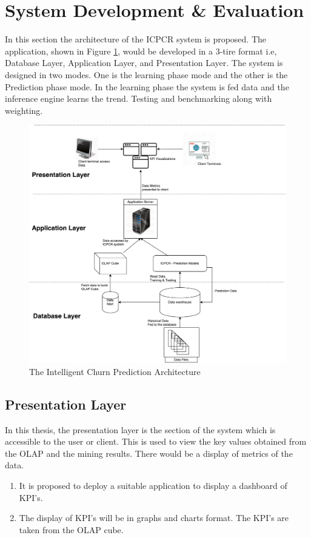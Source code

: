 \section{System Development \& Evaluation}
In this section the architecture of the ICPCR system is proposed. The application, shown in Figure \ref{fig:system-design-churn-prediction}, would be developed in a 3-tire format i.e, Database Layer, Application Layer, and Presentation Layer. The system is designed in two modes. One is the learning phase mode and the other is the Prediction phase mode. In the learning phase the system is fed data and the inference engine learns the trend. Testing and benchmarking along with weighting.
\begin{figure}[h]
	\includegraphics[width=\textwidth]{figures/ICPCR_pic1SystemDesign}
	\centering
	\caption{The Intelligent Churn Prediction Architecture}
	\label{fig:system-design-churn-prediction}
\end{figure}



\subsection{Presentation Layer}
In this thesis, the presentation layer is the section of the system which is accessible to the user or client. This is used to view the key values obtained from the OLAP and the mining results. There would be a display of metrics of the data.
\begin{enumerate}
	\item It is proposed to deploy a suitable application to display a dashboard of KPI's.
	\item The display of KPI's will be in graphs and charts format. The KPI's are taken from the OLAP cube.
\end{enumerate}


